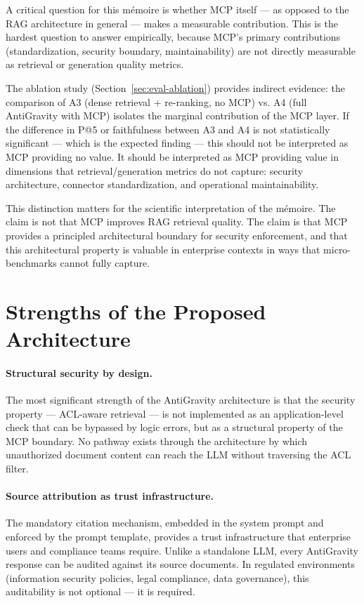 A critical question for this mémoire is whether MCP itself — as opposed to the RAG architecture in general — makes a measurable contribution. This is the hardest question to answer empirically, because MCP's primary contributions (standardization, security boundary, maintainability) are not directly measurable as retrieval or generation quality metrics.

The ablation study (Section~\ref{sec:eval-ablation}) provides indirect evidence: the comparison of A3 (dense retrieval + re-ranking, no MCP) vs. A4 (full AntiGravity with MCP) isolates the marginal contribution of the MCP layer. If the difference in P@5 or faithfulness between A3 and A4 is not statistically significant — which is the expected finding — this should not be interpreted as MCP providing no value. It should be interpreted as MCP providing value in dimensions that retrieval/generation metrics do not capture: security architecture, connector standardization, and operational maintainability.

This distinction matters for the scientific interpretation of the mémoire. The claim is not that MCP improves RAG retrieval quality. The claim is that MCP provides a principled architectural boundary for security enforcement, and that this architectural property is valuable in enterprise contexts in ways that micro-benchmarks cannot fully capture.

\section{Strengths of the Proposed Architecture}
\label{sec:disc-strengths}

\paragraph{Structural security by design.} The most significant strength of the AntiGravity architecture is that the security property --- ACL-aware retrieval --- is not implemented as an application-level check that can be bypassed by logic errors, but as a structural property of the MCP boundary. No pathway exists through the architecture by which unauthorized document content can reach the LLM without traversing the ACL filter.

\paragraph{Source attribution as trust infrastructure.} The mandatory citation mechanism, embedded in the system prompt and enforced by the prompt template, provides a trust infrastructure that enterprise users and compliance teams require. Unlike a standalone LLM, every AntiGravity response can be audited against its source documents. In regulated environments (information security policies, legal compliance, data governance), this auditability is not optional --- it is required.

